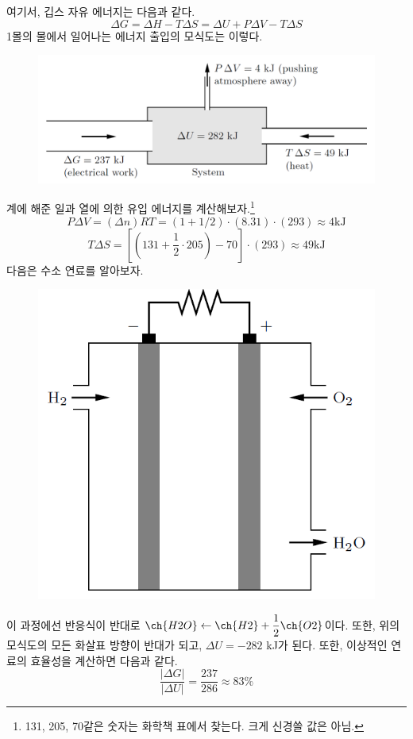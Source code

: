 \documentclass{article}
\begin{document}
여기서, 깁스 자유 에너지는 다음과 같다.
\begin{equation}
    \Delta G = \Delta H - T \Delta S = \Delta U + P\Delta V - T \Delta S
\end{equation}
1몰의 물에서 일어나는 에너지 출입의 모식도는 이렇다.

\begin{figure}[h]
\centering
\includegraphics[width=0.65\linewidth]{images/fig1_4.png}
\end{figure}

계에 해준 일과 열에 의한 유입 에너지를 계산해보자.\footnote{131, 205, 70같은 숫자는 화학책 표에서 찾는다. 크게 신경쓸 값은 아님.}
\begin{equation}
    P \Delta V = (\Delta n) R T = (1 + 1/2) \cdot (8.31) \cdot (293) \approx 4 \text{kJ}
\end{equation}
\begin{equation}
    T \Delta S = \left[ \left( 131 + \frac{1}{2} \cdot 205 \right) -70 \right] \cdot (293) \approx 49 \text{kJ}   
\end{equation}
다음은 수소 연료를 알아보자. 

\begin{figure}[h]
\centering
\includegraphics[width=0.3\linewidth]{images/fig1_5.png}
\end{figure}

이 과정에선 반응식이 반대로 $\ch{H2 O} \leftarrow  \ch{H2} + \dfrac{1}{2} \ch{O2}$이다. 또한, 위의 모식도의 모든 화살표 방향이 반대가 되고, $\Delta U = -282$ kJ가 된다. 또한, 이상적인 연료의 효율성을 계산하면 다음과 같다.
\begin{equation}
    \frac{|\Delta G|}{|\Delta U|} = \frac{237}{286} \approx 83 \%
\end{equation}

\newpage
\end{document}
